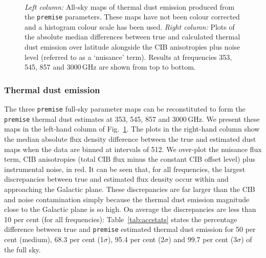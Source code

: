 \documentclass[a4paper,fleqn,usenatbib]{mnras}
\begin{document}
{\begin{figure}
\centering
{}
\,
\,
\,
\,
\caption{{\it{Left column:}} All-sky maps of thermal dust emission produced from the {\texttt{premise}} parameters. These maps have not been colour corrected and a histogram colour scale has been used. {\it{Right column:}} Plots of the absolute median differences between true and calculated thermal dust emission over latitude alongside the CIB anisotropies plus noise level (referred to as a `nuisance' term). Results at frequencies 353, 545, 857 and 3000\,GHz are shown from top to bottom.}
\label{fig:dustmaps}
\end{figure}

\subsubsection{Thermal dust emission}

The three {\texttt{premise}} full-sky parameter maps can be reconstituted to form the {\texttt{premise}} thermal dust estimates at 353, 545, 857 and 3000\,GHz. We present these maps in the left-hand column of Fig.~\ref{fig:dustmaps}. The plots in the right-hand column show the median absolute flux density difference between the true and estimated dust maps when the data are binned at intervals of 512. We over-plot the nuisance flux term, CIB anisotropies (total CIB flux minus the constant CIB offset level) plus instrumental noise, in red. It can be seen that, for all frequencies, the largest discrepancies between true and estimated flux density occur within and approaching the Galactic plane. These discrepancies are far larger than the CIB and noise contamination simply because the thermal dust emission magnitude close to the Galactic plane is so high. On average the discrepancies are less than 10 per cent (for all frequencies): Table~\ref{tab:accstats} states the percentage difference between true and {\texttt{premise}} estimated thermal dust emission for 50 per cent (medium), 68.3 per cent (1$\sigma$), 95.4 per cent (2$\sigma$) and 99.7 per cent (3$\sigma$) of the full sky.


}
\end{document}
